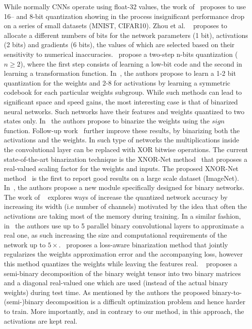 \documentclass[10pt,twocolumn,letterpaper]{article}
\begin{document}
While normally CNNs operate using float-32 values, the work of~\cite{courbariaux2014training, lin2015fixed} proposes to use 16-- and 8-bit quantization showing in the process insignificant performance drop on a series of small datasets (MNIST, CIFAR10). Zhou et al. ~\cite{zhou2016dorefa} proposes to allocate a different numbers of bits for the network parameters (1 bit), activations (2 bits) and gradients (6 bits), the values of which are selected based on their sensitivity to numerical inaccuracies. \cite{wang2018two}~propose a two-step n-bits quantization ($n\geq2$), where the first step consists of learning a low-bit code and the second in learning a transformation function. In~\cite{faraone2018syq}, the authors propose to learn a 1-2 bit quantization for the weights and 2-8 for activations by learning a symmetric codebook for each particular weights subgroup. While such methods can lead to significant space and speed gains, the most interesting case is that of binarized neural networks. Such networks have their features and weights quantized to two states only. In~\cite{soudry2014expectation} the authors propose to binarize the weights using the $sign$ function. Follow-up work~\cite{courbariaux2015binaryconnect, courbariaux2016binarized} further improve these results, by binarizing both the activations and the weights. In such type of networks the multiplications inside the convolutional layer can be replaced with XOR bitwise operations. The current state-of-the-art binarization technique is the XNOR-Net method~\cite{rastegari2016xnor} that proposes a real-valued scaling factor for the weights and inputs. The proposed XNOR-Net method~\cite{rastegari2016xnor} is the first to report good results on a large scale dataset (ImageNet). In~\cite{bulat2017binarized}, the authors propose a new module specifically designed for binary networks. The work of ~\cite{mishra2017wrpn} explores ways of increase the quantized network accuracy by increasing its width (i.e number of channels) motivated by the idea that often the activations are taking most of the memory during training. In a similar fashion, in~\cite{lin2017towards} the authors use up to 5 parallel binary convolutional layers to approximate a real one, as such increasing the size and computational requirements of the network up to $5\times$. \cite{zhou2018explicit}~proposes a loss-aware binarization method that jointly regularizes the weights approximation error and the accompanying loss, however this method quantizes the weights while leaving the features real. ~\cite{hu2018training} proposes a semi-binary decomposition of the binary weight tensor into two binary matrices and a diagonal real-valued one which are used (instead of the actual binary weights) during test time. As mentioned by the authors the proposed binary-to-(semi-)binary decomposition is a difficult optimization problem and hence harder to train. More importantly, and in contrary to our method, in this approach, the activations are kept real. 
\end{document}

